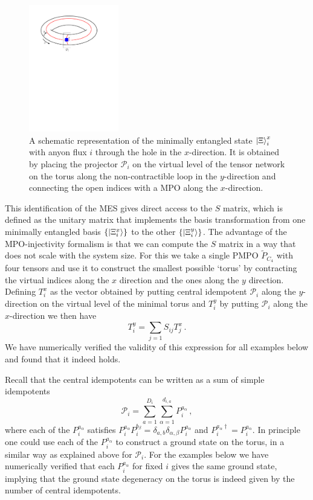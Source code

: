 \documentclass[12 pt]{article}
\begin{document}
\begin{figure}
  \centering
    \includegraphics[width=0.35\textwidth]{MES}
\caption{A schematic representation of the minimally entangled state $\ket{\Xi}^x_i$ with anyon flux $i$ through the hole in the $x$-direction. It is obtained by placing the projector $\mathcal{P}_i$ on the virtual level of the tensor network on the torus along the non-contractible loop in the $y$-direction and connecting the open indices with a MPO along the $x$-direction.}
\label{fig:MES}
\end{figure}

This identification of the MES gives direct access to the $S$ matrix, which is defined as the unitary matrix that implements the basis transformation from one minimally entangled basis $\{\ket{\Xi^x_i} \}$ to the other $\{\ket{\Xi^y_i} \}$. The advantage of the MPO-injectivity formalism is that we can compute the $S$ matrix in a way that does not scale with the system size. For this we take a single PMPO $\tilde{P}_{C_4}$ with four tensors and use it to construct the smallest possible `torus' by contracting the virtual indices along the $x$ direction and the ones along the $y$ direction. Defining $T_i^x$ as the vector obtained by putting central idempotent $\mathcal{P}_i$ along the $y$-direction on the virtual level of the minimal torus and $T_i^y$ by putting $\mathcal{P}_i$ along the $x$-direction we then have
\begin{equation}
T_i^y = \sum_{j = 1} S_{ij} T_j^x\, .
\end{equation}
We have numerically verified the validity of this expression for all examples below and found that it indeed holds.

Recall that the central idempotents can be written as a sum of simple idempotents
\begin{equation}
\mathcal{P}_i = \sum_{a=1}^{D_i}\sum_{\alpha = 1}^{d_{i,a}} P^{a_\alpha}_i\, ,
\end{equation}
where each of the $P^{a_\alpha}_i$ satisfies $P^{a_\alpha}_iP^{b_\beta}_i = \delta_{a,b}\delta_{\alpha,\beta}P^{a_\alpha}_i$ and $P^{a_\alpha \dagger}_i = P_i^{a_\alpha}$. In principle one could use each of the $P^{a_\alpha}_i$ to construct a ground state on the torus, in a similar way as explained above for $\mathcal{P}_i$. For the examples below we have numerically verified that each $P^{a_\alpha}_i$ for fixed $i$ gives the same ground state, implying that the ground state degeneracy on the torus is indeed given by the number of central idempotents. 
\end{document}
